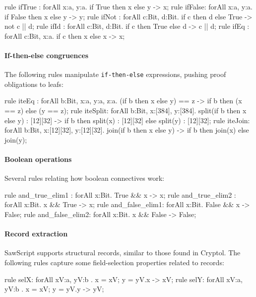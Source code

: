 \documentclass[12pt]{galois-whitepaper}
\newcommand{\sawScript}{{\sc SawScript}\xspace}
\begin{document}
\begin{code}
  rule ifTrue : forAll {x:a, y:a}.     if True  then x else y -> x;
  rule ifFalse: forAll {x:a, y:a}.     if False then x else y -> y;
  rule ifNot  : forAll {c:Bit, d:Bit}. if c then d else True  -> not c || d;
  rule ifId   : forAll {c:Bit, d:Bit}. if c then True else d  -> c || d;
  rule ifEq   : forAll {c:Bit, x:a}.   if c then x else x     -> x;
\end{code}

\paragraph{If-then-else congruences} The following rules manipulate {\tt if-then-else} expressions,
pushing proof obligations to leafs:

\begin{code}
rule iteEq : forAll {b:Bit, x:a, y:a, z:a}.
    (if b then x else y) == z -> if b then (x == z) else (y == z);
rule iteSplit: forAll {b:Bit, x:[384], y:[384]}.
    split(if b then x else y) : [12][32] -> 
       if b then split(x) : [12][32] else split(y) : [12][32];
rule iteJoin: forAll {b:Bit, x:[12][32], y:[12][32]}.
    join(if b then x else y) -> if b then join(x) else join(y);
\end{code}

\paragraph{Boolean operations} Several rules relating how boolean connectives work:
\begin{code}
  rule and_true_elim1 : forAll {x:Bit}. True && x  -> x;
  rule and_true_elim2 : forAll {x:Bit}. x && True  -> x;
  rule and_false_elim1: forAll {x:Bit}. False && x -> False;
  rule and_false_elim2: forAll {x:Bit}. x && False -> False;
\end{code}

\paragraph{Record extraction} \sawScript supports structural records, similar to those found in Cryptol.
The following rules capture some field-selection properties related to records:

\begin{code}
  rule selX: forAll { xV:a, yV:b }. {x = xV; y = yV}.x -> xV;
  rule selY: forAll { xV:a, yV:b }. {x = xV; y = yV}.y -> yV;
\end{code}
\end{document}
